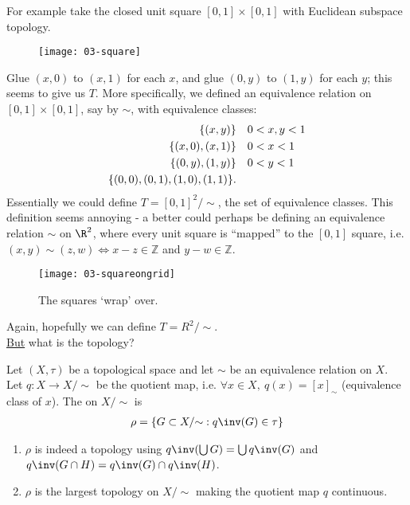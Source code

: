 For example take the closed unit square $[0,1]\times[0,1]$ with Euclidean subspace topology.
\begin{figure}[h]
    \centering
    \texttt{[image: 03-square]}
\end{figure}
Glue $(x,0)$ to $(x,1)$ for each $x$, and glue $(0,y)$ to $(1,y)$ for each $y$; this seems to give us $T$. More specifically, we defined an equivalence relation on $[0,1]\times[0,1]$, say by $\sim$, with equivalence classes:
\begin{align*}
    \{(x,y)\} & \quad 0<x,y<1\\
    \{(x,0),(x,1)\} & \quad 0<x<1\\
    \{(0,y),(1,y)\} & \quad 0<y<1\\
    \{(0,0), (0,1), (1,0), (1,1)\}.
\end{align*}
Essentially we could define $T = [0,1]^2 / {\sim}$, the set of equivalence classes.
This definition seems annoying - a better could perhaps be defining an equivalence relation $\sim$ on $\R^2$, where every unit square is ``mapped'' to the $[0,1]$ square, i.e. $(x,y)\sim(z,w) \Leftrightarrow x-z\in \mathbb{Z}$ and $y-w\in \mathbb{Z}$.
\begin{figure}[h]
    \centering
    \texttt{[image: 03-squareongrid]}
    \caption{The squares `wrap' over.}
\end{figure}
Again, hopefully we can define $T = R^2/ {\sim}$. \\
\underline{But} what is the topology?
\begin{definition}
    Let $(X,\tau)$ be a topological space and let $\sim$ be an equivalence relation on $X$. Let $q: X\to X/ {\sim}$ be the quotient map, i.e. $\forall x \in X,\ q(x) = [x]_\sim$ (equivalence class of $x$).
    The  on $X/ {\sim}$ is
    \begin{align*}
        \rho = \Set{G\subset X/ {\sim}}{q\inv(G)\in \tau}
    \end{align*}
\end{definition}

\begin{remark}
    \begin{enumerate}
        \item $\rho$ is indeed a topology using $q\inv(\bigcup G) = \bigcup q\inv(G)$ and $q\inv (G\cap H) = q\inv(G)\cap q\inv (H)$.

        \item $\rho$ is the largest topology on $X/ {\sim}$ making the quotient map $q$ continuous.
    \end{enumerate}
\end{remark}

